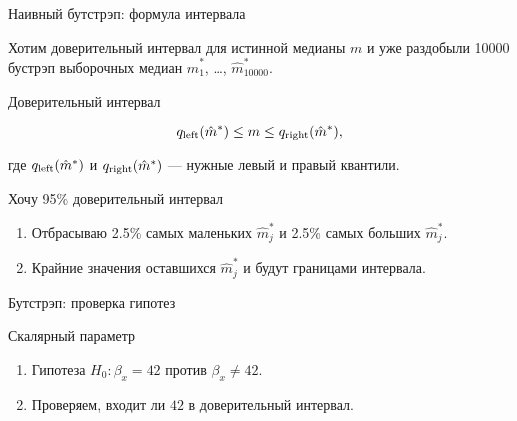 \begin{frame}{Наивный бутстрэп: формула интервала}

Хотим доверительный интервал для истинной медианы $m$ и уже раздобыли 10000 бустрэп выборочных медиан $\hat m^*_1$, \ldots, $\hat m^*_{10000}$.

\pause
\begin{block}{Доверительный интервал}

  \[
  q_{\text{left}}(\hat m^*) \leq m \leq q_{\text{right}}(\hat m^*),  
  \]

  где $q_{\text{left}}(\hat m^*)$ и $q_{\text{right}}(\hat m^*)$ — нужные левый и правый квантили. 
\end{block}

\pause
\begin{block}{Хочу 95\% доверительный интервал}

\begin{enumerate}[<+->]
  \item Отбрасываю 2.5\% самых маленьких $\hat m^*_j$ и 
  2.5\% самых больших $\hat m^*_j$.
  \item Крайние значения оставшихся $\hat m^*_j$ и будут границами интервала. 
\end{enumerate}
\end{block}

\end{frame}

\begin{frame}{Бутстрэп: проверка гипотез}

\pause
\alert{Скалярный параметр}
\begin{enumerate}[<+->]
  \item Гипотеза $H_0: \beta_x = 42$ против $\beta_x \neq 42$.
  \item Проверяем, входит ли $42$ в доверительный интервал. 
\end{enumerate}


\end{frame}
  

